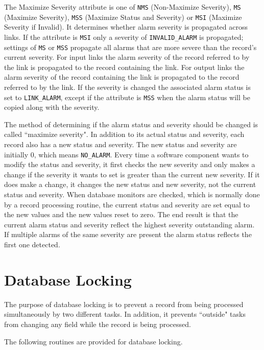 The Maximize Severity attribute is one of \verb|NMS| (Non-Maximize Severity), \verb|MS| (Maximize Severity),
\verb|MSS| (Maximize Status and Severity) or \verb|MSI| (Maximize Severity if Invalid).
It determines whether alarm severity is propagated across links.
If the attribute is \verb|MSI| only a severity of \verb|INVALID_ALARM| is propagated; settings of \verb|MS| or \verb|MSS|
propagate all alarms that are more severe than the record's current severity.
For input links the alarm severity of the record referred to by the link is propagated to the record containing the link.
For output links the alarm severity of the record containing the link is propagated to the record referred to by the link.
If the severity is changed the associated alarm status is set to \verb|LINK_ALARM|, except if the attribute is \verb|MSS|
when the alarm status will be copied along with the severity.

The method of determining if the alarm status and severity should be changed is called ``maximize severity".
In addition to its actual status and severity, each record also has a new status and severity.
The new status and severity are initially 0, which means \verb|NO_ALARM|.
Every time a software component wants to modify the status and severity, it first checks the new severity and only makes a
change if the severity it wants to set is greater than the current new severity.
If it does make a change, it changes the new status and new severity, not the current status and severity.
When database monitors are checked, which is normally done by a record processing routine, the current status and severity
are set equal to the new values and the new values reset to zero.
The end result is that the current alarm status and severity reflect the highest severity outstanding alarm.
If multiple alarms of the same severity are present the alarm status reflects the first one detected.

\section{Database Locking}

The purpose of database locking is to prevent a record from being processed simultaneously by two different tasks. In 
addition, it prevents ``outside" tasks from changing any field while the record is being processed.

The following routines are provided for database locking.

